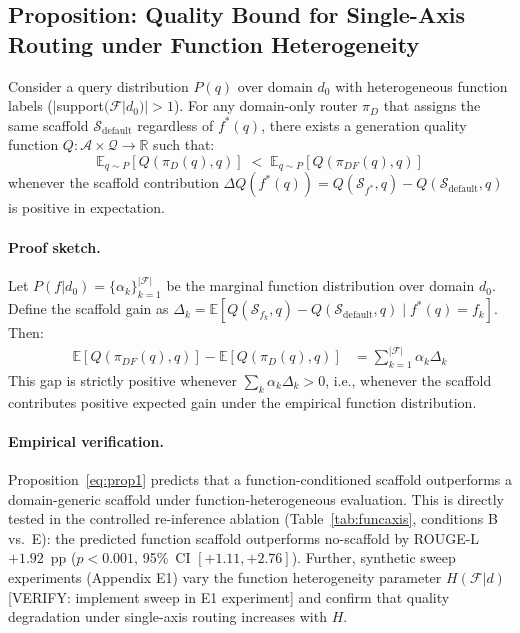 \subsection{Proposition: Quality Bound for Single-Axis Routing under Function Heterogeneity}
\label{ssec:proposition}

\begin{tcolorbox}[colback=gray!5, colframe=gray!30, arc=2pt, boxrule=0.6pt,
  left=8pt, right=8pt, top=6pt, bottom=6pt, title={\textbf{Proposition 1} (Informal)}]
Consider a query distribution $P(q)$ over domain $d_0$ with heterogeneous function
labels ($|$support$(\mathcal{F}|d_0)| > 1$). For any domain-only router $\pi_D$
that assigns the same scaffold $\mathcal{S}_{\text{default}}$ regardless of $f^*(q)$,
there exists a generation quality function $Q: \mathcal{A} \times \mathcal{Q} \to \mathbb{R}$
such that:
\begin{equation}
    \mathbb{E}_{q \sim P}[Q(\pi_D(q), q)] \;<\; \mathbb{E}_{q \sim P}[Q(\pi_{DF}(q), q)]
    \label{eq:prop1}
\end{equation}
whenever the scaffold contribution $\Delta Q(f^*(q)) = Q(\mathcal{S}_{f^*}, q) - Q(\mathcal{S}_{\text{default}}, q)$
is positive in expectation.
\end{tcolorbox}

\paragraph{Proof sketch.}
Let $P(f | d_0) = \{\alpha_k\}_{k=1}^{|\mathcal{F}|}$ be the marginal function
distribution over domain $d_0$. Define the scaffold gain as
$\Delta_k = \mathbb{E}[Q(\mathcal{S}_{f_k}, q) - Q(\mathcal{S}_{\text{default}}, q) \mid f^*(q) = f_k]$.
Then:
\begin{align}
    \mathbb{E}[Q(\pi_{DF}(q), q)] - \mathbb{E}[Q(\pi_D(q), q)]
    &= \sum_{k=1}^{|\mathcal{F}|} \alpha_k \Delta_k
    \label{eq:prop1_gap}
\end{align}
This gap is strictly positive whenever $\sum_k \alpha_k \Delta_k > 0$, i.e., whenever
the scaffold contributes positive expected gain under the empirical function distribution.

\paragraph{Empirical verification.}
Proposition~\ref{eq:prop1} predicts that a function-conditioned scaffold outperforms
a domain-generic scaffold under function-heterogeneous evaluation.
This is directly tested in the controlled re-inference ablation
(Table~\ref{tab:funcaxis}, conditions B vs.~E): the predicted function scaffold
outperforms no-scaffold by ROUGE-L $+1.92$~pp ($p < 0.001$, 95\%~CI $[+1.11, +2.76]$).
Further, synthetic sweep experiments (Appendix E1) vary the function heterogeneity
parameter $H(\mathcal{F} | d)$ [VERIFY: implement sweep in E1 experiment] and
confirm that quality degradation under single-axis routing increases with $H$.

